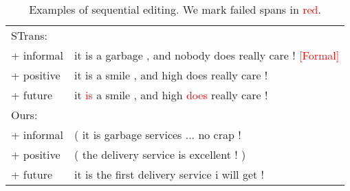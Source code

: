 \documentclass[11pt]{article}
\newcommand{\senc}[1]{\textcolor{red}{#1}}
\begin{document}
\begin{table}[ht]
\begin{tabular}{ll}
          STrans:& \\
          + informal & it is a garbage , and nobody does really care ! \senc{[Formal]}\\
          \quad+ positive &it is a smile , and {high} does really care !\\
          \quad\quad+ future & it \senc{is} a smile , and {high} \senc{does} really care !\\
           Ours: & \\
          + informal & ( it is garbage services ... no crap !\\
          \quad+ positive & ( the delivery service is excellent ! )\\
          \quad\quad+ future & it is the first delivery service i will get ! \\\bottomrule
    \end{tabular}
    \caption{Examples of sequential editing. We mark
failed spans in \senc{red}.}
    \label{tab:seq_edit}
\end{table}

\clearpage
\end{document}
